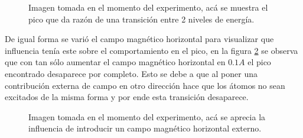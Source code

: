 \documentclass[%
 reprint,
 amsmath,amssymb,
 aps,
]{revtex4-1}
\begin{document}
\begin{figure}[h]
\caption{\label{foto pico} Imagen tomada en el momento del experimento, acá se muestra el pico que da razón de una transición entre 2 niveles de energía.}
\end{figure}
De igual forma se varió el campo magnético horizontal para visualizar que influencia tenía este sobre el comportamiento en el pico, en la figura \ref{foto muerto} se observa que con tan sólo aumentar el campo magnético horizontal en $0.1 A$ el pico encontrado desaparece por completo. Esto se debe a que al poner una contribución externa de campo en otro dirección hace que los átomos no sean excitados de la misma forma y por ende esta transición desaparece.

\begin{figure}[h]
\caption{\label{foto muerto}  Imagen tomada en el momento del experimento, acá se aprecia la influencia de introducir un campo magnético horizontal externo.}
\end{figure}
\end{document}

